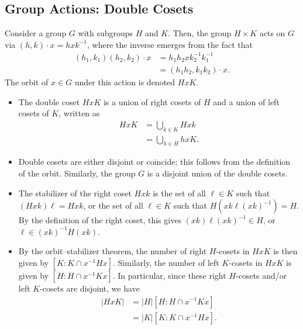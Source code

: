 \documentclass[10pt]{mypackage}
\begin{document}
\subsection{Group Actions: Double Cosets}%
Consider a group $G$ with subgroups $H$ and $K$. Then, the group $H\times K$ acts on $G$ via $\left( h,k \right)\cdot x = hxk^{-1}$, where the inverse emerges from the fact that
\begin{align*}
  \left( h_1,k_1 \right)\left( h_2,k_2 \right)\cdot x &= h_1h_2xk_2^{-1}k_1^{-1}\\
                                                      &= \left( h_1h_2,k_1k_2 \right)\cdot x.
\end{align*}
The orbit of $x\in G$ under this action is denoted $HxK$. 
\begin{itemize}
  \item The double coset $HxK$ is a union of right cosets of $H$ and a union of left cosets of $K$, written as
    \begin{align*}
      HxK &= \bigcup_{k\in K}Hxk\\
          &= \bigcup_{h\in H} hxK.
    \end{align*}
  \item Double cosets are either disjoint or coincide; this follows from the definition of the orbit. Similarly, the group $G$ is a disjoint union of the double cosets.
  \item The stabilizer of the right coset $Hxk$ is the set of all $\ell\in K$ such that $\left( Hxk \right)\ell = Hxk$, or the set of all $\ell\in K$ such that $H\left( xk \ell \left( xk \right)^{-1} \right) = H$. By the definition of the right coset, this gives $\left( xk \right)\ell \left( xk \right)^{-1}\in H$, or $\ell\in \left( xk \right)^{-1}H\left( xk \right)$.
  \item By the orbit--stabilizer theorem, the number of right $H$-cosets in $HxK$ is then given by $\left[ K:K\cap x^{-1}Hx \right]$. Similarly, the number of left $K$-cosets in $HxK$ is given by $\left[ H:H\cap x^{-1}Kx \right]$. In particular, since these right $H$-cosets and/or left $K$-cosets are disjoint, we have
    \begin{align*}
      \left\vert HxK \right\vert &= \left\vert H \right\vert \left[ H:H\cap x^{-1}Kx \right]\\
                                 &= \left\vert K \right\vert \left[ K:K\cap x^{-1}Hx \right].
    \end{align*}
\end{itemize}
\end{document}
